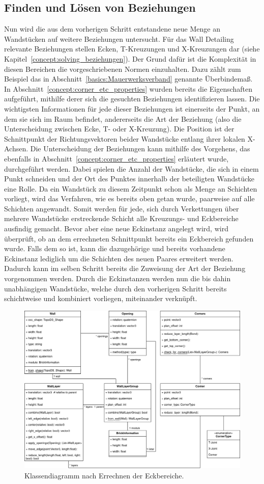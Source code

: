\subsection{Finden und Lösen von Beziehungen}
Nun wird die aus dem vorherigen Schritt entstandene neue Menge an Wandstücken auf weitere Beziehungen untersucht.
Für das Wall Detailing relevante Beziehungen stellen Ecken, T-Kreuzungen und X-Kreuzungen dar (siehe Kapitel~\ref{concept:solving_beziehungen}).
Der Grund dafür ist die Komplexität in diesen Bereichen die vorgeschriebenen Normen einzuhalten.
Dazu zählt zum Beispiel das in Abschnitt~\ref{basics:Mauerwerksverband} genannte Überbindemaß.
In Abschnitt~\ref{concept:corner_etc_properties} wurden bereits die Eigenschaften aufgeführt, mithilfe derer sich die gesuchten Beziehungen identifizieren lassen.
Die wichtigsten Informationen für jede dieser Beziehungen ist einerseits der Punkt, an dem sie sich im Raum befindet, andererseits die Art der Beziehung (also die Unterscheidung zwischen Ecke, T- oder X-Kreuzung).
Die Position ist der Schnittpunkt der Richtungsvektoren beider Wandstücke entlang ihrer lokalen X-Achsen.
Die Unterscheidung der Beziehungen kann mithilfe des Vorgehens, das ebenfalls in Abschnitt~\ref{concept:corner_etc_properties} erläutert wurde, durchgeführt werden.
Dabei spielen die Anzahl der Wandstücke, die sich in einem Punkt schneiden und der Ort des Punktes innerhalb der beteiligten Wandstücke eine Rolle.
Da ein Wandstück zu diesem Zeitpunkt schon als Menge an Schichten vorliegt, wird das Verfahren, wie es bereits oben getan wurde, paarweise auf alle Schichten angewandt.
Somit werden für jede, sich durch Verkettungen über mehrere Wandstücke erstreckende Schicht alle Kreuzungs- und Eckbereiche ausfindig gemacht.
Bevor aber eine neue Eckinstanz angelegt wird, wird überprüft, ob an dem errechneten Schnittpunkt bereits ein Eckbereich gefunden wurde.
Falls dem so ist, kann die dazugehörige und bereits vorhandene Eckinstanz lediglich um die Schichten des neuen Paares erweitert werden.
Dadurch kann im selben Schritt bereits die Zuweisung der Art der Beziehung vorgenommen werden.
Durch die Eckinstanzen werden nun die bis dahin unabhängigen Wandstücke, welche durch den vorherigen Schritt bereits schichtweise und kombiniert vorliegen, miteinander verknüpft.
\begin{figure}[hb]
  \centering
  \includegraphics[width=0.8\columnwidth]{fig/klassendiagramm_corners.drawio.png}
  \caption{Klassendiagramm nach Errechnen der Eckbereiche.}
  \label{fig:real:class_diagram_corners}
\end{figure}
